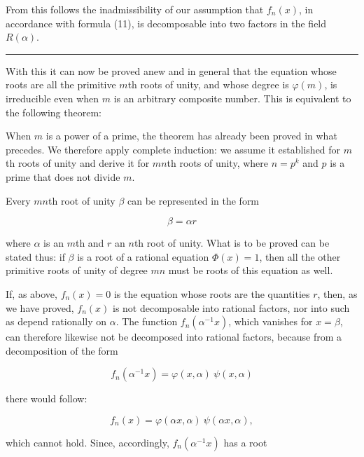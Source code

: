 From this follows the inadmissibility of our assumption that $f_n(x)$, in accordance with formula (11), is decomposable into two factors in the field $R(\alpha)$.

\begin{center}
\rule{4cm}{0.4pt}
\end{center}

With this it can now be proved anew and in general that the equation whose roots are all the primitive $m$th roots of unity, and whose degree is $\varphi(m)$, is irreducible even when $m$ is an arbitrary composite number. This is equivalent to the following theorem:


When $m$ is a power of a prime, the theorem has already been proved in what precedes. We therefore apply complete induction: we assume it established for $m$th roots of unity and derive it for $mn$th roots of unity, where $n = p^k$ and $p$ is a prime that does not divide $m$.

Every $mn$th root of unity $\beta$ can be represented in the form

\[
\beta = \alpha r
\]

where $\alpha$ is an $m$th and $r$ an $n$th root of unity. What is to be proved can be stated thus: if $\beta$ is a root of a rational equation $\Phi(x) = 1$, %
then all the other primitive roots of unity of degree $mn$ must be roots of this equation as well.

If, as above, $f_n(x) = 0$ is the equation whose roots are the quantities $r$, then, as we have proved, $f_n(x)$ is not decomposable into rational factors, nor into such as depend rationally on $\alpha$. The function $f_n(\alpha^{-1}x)$, which vanishes for $x = \beta$, can therefore likewise not be decomposed into rational factors, because from a decomposition of the form

\[
f_n(\alpha^{-1}x) = \varphi(x,\alpha)\ \psi(x,\alpha)
\]

there would follow:

\[
f_n(x) = \varphi(\alpha x,\alpha)\ \psi(\alpha x,\alpha),
\]

which cannot hold. Since, accordingly, $f_n(\alpha^{-1}x)$ has a root
